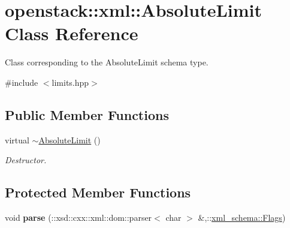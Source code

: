 \hypertarget{classopenstack_1_1xml_1_1AbsoluteLimit}{
\section{openstack::xml::AbsoluteLimit Class Reference}
\label{classopenstack_1_1xml_1_1AbsoluteLimit}
}


Class corresponding to the AbsoluteLimit schema type.  




{\ttfamily \#include $<$limits.hpp$>$}

\subsection*{Public Member Functions}
\begin{DoxyCompactItemize}
\item 
\hypertarget{classopenstack_1_1xml_1_1AbsoluteLimit_a1dab83e2c2a0cef6cf1046531550d78e}{
virtual \hyperlink{classopenstack_1_1xml_1_1AbsoluteLimit_a1dab83e2c2a0cef6cf1046531550d78e}{$\sim$AbsoluteLimit} ()}
\label{classopenstack_1_1xml_1_1AbsoluteLimit_a1dab83e2c2a0cef6cf1046531550d78e}

\begin{DoxyCompactList}\small\item\em Destructor. \item\end{DoxyCompactList}\end{DoxyCompactItemize}
\subsection*{Protected Member Functions}
\begin{DoxyCompactItemize}
\item 
\hypertarget{classopenstack_1_1xml_1_1AbsoluteLimit_a7ab0aa05b62c00ef9d97b2a2cf7f2395}{
void {\bfseries parse} (::xsd::cxx::xml::dom::parser$<$ char $>$ \&,::\hyperlink{namespacexml__schema_affb4c227cbd9aa7453dd1dc5a1401943}{xml\_\-schema::Flags})}
\label{classopenstack_1_1xml_1_1AbsoluteLimit_a7ab0aa05b62c00ef9d97b2a2cf7f2395}

\end{DoxyCompactItemize}
